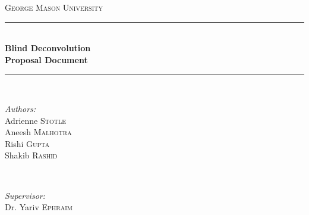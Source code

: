 \documentclass[11pt]{article}
\begin{document}
\begin{titlepage}

\newcommand{\HRule}{\rule{\linewidth}{0.5mm}} %

\center %
 

\textsc{\LARGE George Mason University}\\[1.5cm] %



\HRule \\[0.4cm]
{ \huge \bfseries Blind Deconvolution}\\[0.4cm] %
\LARGE{\textbf{Proposal Document}}
\HRule \\[1.5cm]
 
\begin{minipage}{0.4\textwidth}
\begin{flushleft} \large
\emph{Authors:}\\
Adrienne \textsc{Stotle} \\
Aneesh \textsc{Malhotra} \\ 
Rishi \textsc{Gupta} \\ 
Shakib \textsc{Rashid} %
\end{flushleft}
\end{minipage}
~
\begin{minipage}{0.4\textwidth}
\begin{flushright} \large
\emph{Supervisor:} \\
Dr. Yariv \textsc{Ephraim} %
\end{flushright}
\end{minipage}\\[2cm]



\end{titlepage}
\end{document}

